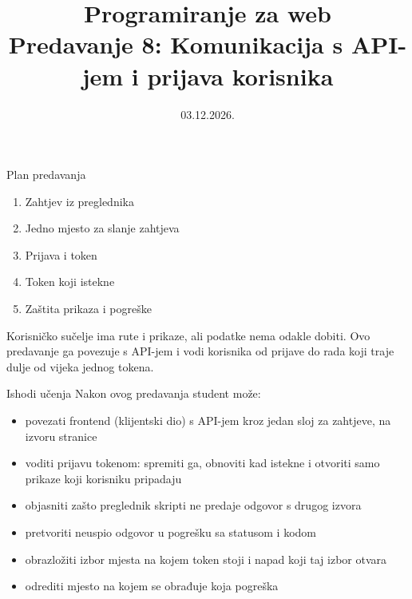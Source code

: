 

\title[Predavanje 8: Komunikacija s API-jem]{Programiranje za web \\ Predavanje 8: Komunikacija s API-jem i prijava korisnika}
\date{03.12.2026.}



\frame{\titlepage}

\begin{frame}{Plan predavanja}
\begin{enumerate}
  \item Zahtjev iz preglednika
  \item Jedno mjesto za slanje zahtjeva
  \item Prijava i token
  \item Token koji istekne
  \item Zaštita prikaza i pogreške
\end{enumerate}

\vspace{0.6em}
Korisničko sučelje ima rute i prikaze, ali podatke nema odakle dobiti. Ovo predavanje ga povezuje s API-jem i vodi korisnika od prijave do rada koji traje dulje od vijeka jednog tokena.
\end{frame}

\begin{frame}{Ishodi učenja}
Nakon ovog predavanja student može:

\begin{itemize}
  \item povezati frontend (klijentski dio) s API-jem kroz jedan sloj za zahtjeve, na izvoru stranice
  \item voditi prijavu tokenom: spremiti ga, obnoviti kad istekne i otvoriti samo prikaze koji korisniku pripadaju
  \item objasniti zašto preglednik skripti ne predaje odgovor s drugog izvora
  \item pretvoriti neuspio odgovor u pogrešku sa statusom i kodom
  \item obrazložiti izbor mjesta na kojem token stoji i napad koji taj izbor otvara
  \item odrediti mjesto na kojem se obrađuje koja pogreška
\end{itemize}
\end{frame}

